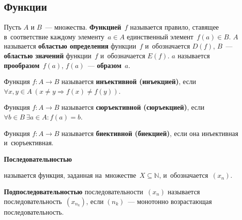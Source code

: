 \subsection{Функции}
\hypertarget{def:function}{} Пусть $A$ и $B$~--- множества.
\textbf{Функцией}~$f$ называется правило, ставящее в~соответствие каждому элементу~$a \in A$ единственный элемент~$f(a) \in B$.
$A$ называется \textbf{областью определения} функции~$f$ и~обозначается $D(f)$, $B$~--- \textbf{областью значений} функции~$f$ и~обозначается $E(f)$.
$a$ называется \textbf{прообразом}~$f(a)$, $f(a)$~--- \textbf{образом}~$a$.

\hypertarget{def:injection}{} Функция $f \colon A \to B$ называется \textbf{инъективной (инъекцией)}, если
$\forall x, y \in A	\ \allowbreak (x \neq y \Rightarrow f(x) \neq f(y))$.

\hypertarget{def:surjection}{} Функция $f \colon A \to B$ называется \textbf{сюръективной (сюръекцией)}, если
$\forall b \in B \ \allowbreak \exists a \in A \colon \allowbreak f(a) = b$.

\hypertarget{def:bijection}{} Функция $f \colon A \to B$ называется \textbf{биективной (биекцией)}, если она инъективная
и~сюръективная.

\hypertarget{def:sequence}{\textbf{Последовательностью}} называется функция, заданная на~множестве~$X \subseteq \mathbb N$, и~обозначается~$(x_n)$.

\textbf{Подпоследовательностью} последовательности~$(x_n)$ называется последовательность~$(x_{n_k})$, если $(n_k)$~--- монотонно возрастающая последовательность.